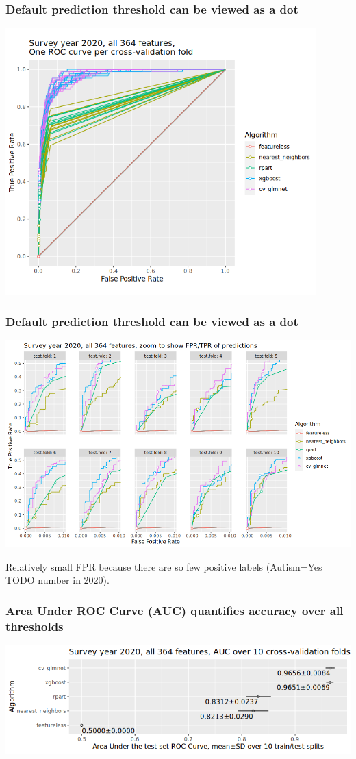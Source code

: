 \documentclass{beamer}
\begin{document}
\begin{frame}
  \frametitle{Default prediction threshold can be viewed as a dot}
  \includegraphics[width=0.9\textwidth]{download-nsch-mlr3batchmark-registry-one-set-all-features-roc-point.png}
\end{frame}

\begin{frame}
  \frametitle{Default prediction threshold can be viewed as a dot}
  \includegraphics[width=\textwidth]{download-nsch-mlr3batchmark-registry-one-set-all-features-roc-zoom.png}

  Relatively small FPR because there are so few positive labels
  (Autism=Yes TODO number in 2020).
\end{frame}

\begin{frame}
  \frametitle{Area Under ROC Curve (AUC) quantifies accuracy over all thresholds}
  \includegraphics[width=\textwidth]{download-nsch-mlr3batchmark-registry-one-set-all-features-auc.png}
\end{frame}
\end{document}
